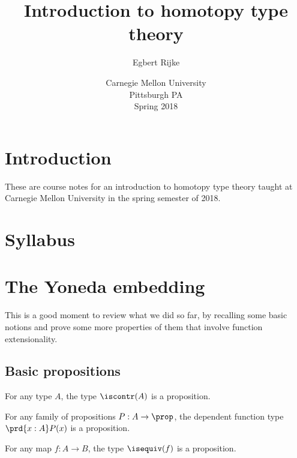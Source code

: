 \documentclass[11pt]{memoir} %
\title{Introduction to homotopy type theory}
\author{Egbert Rijke}
\date{Carnegie Mellon University\\Pittsburgh PA\\Spring 2018}
\begin{document}
\begin{titlingpage}
\maketitle 
\end{titlingpage}

\frontmatter
\tableofcontents

\chapter{Introduction}
These are course notes for an introduction to homotopy type theory taught at Carnegie Mellon University in the spring semester of 2018.

\chapter{Syllabus}

\mainmatter 















\chapter{The Yoneda embedding}
This is a good moment to review what we did so far, by recalling some basic notions and prove some more properties of them that involve function extensionality.

\section{Basic propositions}
\begin{lem}
For any type $A$, the type $\iscontr(A)$ is a proposition.
\end{lem}

\begin{lem}
For any family of propositions $P:A\to\prop$, the dependent function type $\prd{x:A}P(x)$ is a proposition.
\end{lem}

\begin{cor}
For any map $f:A\to B$, the type $\isequiv(f)$ is a proposition.
\end{cor}
\end{document}
